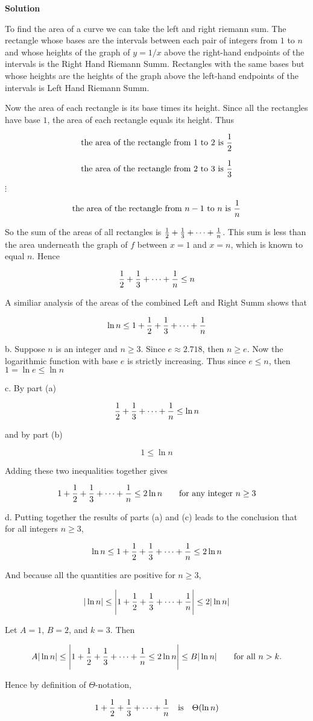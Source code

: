 \vskip 3mm
{\bf Solution}

\vskip 1mm
To find the area of a curve we can take the left and right riemann sum. The rectangle whose bases are the intervals between each pair of integers from $1$ to $n$ and whose heights of the graph of $y=1/x$ above the right-hand endpoints of the intervals is the Right Hand Riemann Summ. Rectangles with the same bases but whose heights are the heights of the graph above the left-hand endpoints of the intervals is Left Hand Riemann Summ.

\vskip 1mm
Now the area of each rectangle is its base times its height. Since all the rectangles have base $1$, the area of each rectangle equals its height. Thus

$$\hbox{the area of the rectangle from $1$ to $2$ is }{1\over 2}$$

$$\hbox{the area of the rectangle from $2$ to $3$ is }{1\over 3}$$
\centerline{$\vdots$}
$$\hbox{the area of the rectangle from $n-1$ to $n$ is }{1\over n}$$

So the sum of the areas of all rectangles is ${1\over 2}+{1\over 3}+\cdots+{1\over n}$. This sum is less than the area underneath the graph of $f$ between $x=1$ and $x=n$, which is known to equal $n$. Hence

$${1\over 2}+{1\over 3}+\cdots+{1\over n}\leq n$$

A similiar analysis of the areas of the combined Left and Right Summ shows that

$$\ln n\leq 1+{1\over 2}+{1\over 3}+\cdots+{1\over n}$$

b. Suppose $n$ is an integer and $n\geq 3$. Since $e\approx 2.718$, then $n\geq e$. Now the logarithmic function with base $e$ is strictly increasing. Thus since $e\leq n$, then $1=\ln e\leq\ln n$

\vskip 2mm
c. By part (a)

$${1\over 2}+{1\over 3}+\cdots+{1\over n}\leq\ln n$$

and by part (b)

$$1\leq\ln n$$

Adding these two inequalities together gives

$$1+{1\over 2}+{1\over 3}+\cdots+{1\over n}\leq 2\ln n\qquad\hbox{for any integer $n\geq 3$}$$

d. Putting together the results of parts (a) and (c) leads to the conclusion that for all integers $n\geq 3$,

$$\ln n\leq 1+{1\over 2}+{1\over 3}+\cdots+{1\over n}\leq 2\ln n$$

And because all the quantities are positive for $n\geq 3$,

$$|\ln n|\leq \Biggl|1+{1\over 2}+{1\over 3}+\cdots+{1\over n}\Biggr|\leq 2|\ln n|$$

Let $A=1$, $B=2$, and $k=3$. Then

$$A|\ln n|\leq\Biggl|1+{1\over 2}+{1\over 3}+\cdots+{1\over n}\leq 2\ln n\Biggr|\leq B|\ln n|\qquad\hbox{for all $n>k$.}$$

Hence by definition of $\Theta$-notation,

$$1+{1\over 2}+{1\over 3}+\cdots+{1\over n}\quad\hbox{is}\quad\Theta(\ln n)$$


\vfill\eject
\bye
